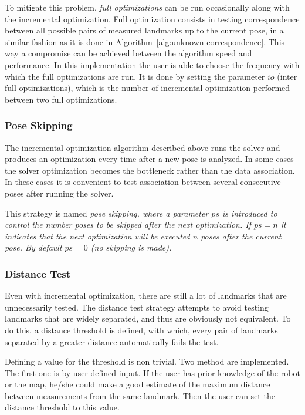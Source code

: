 To mitigate this problem, \emph{full optimizations} can be run occasionally along with the incremental optimization. Full optimization consists in testing correspondence between all possible pairs of measured landmarks up to the current pose, in a similar fashion as it is done in Algorithm~\ref{alg:unknown-correspondence}. This way a compromise can be achieved between the algorithm speed and performance. In this implementation the user is able to choose the frequency with which the full optimizations are run. It is done by setting the parameter $io$ (inter full optimizations), which is the number of incremental optimization performed between two full optimizations. 

\subsubsection{Pose Skipping}

The incremental optimization algorithm described above runs the solver and produces an optimization every time after a new pose is analyzed. In some cases the solver optimization becomes the bottleneck rather than the data association. In these cases it is convenient to  test association between several consecutive poses after running the solver.

This strategy is named \it{pose skipping}, where a parameter $ps$ is introduced to control the number poses to be skipped after the next optimization. If $ps=n$ it indicates that the next optimization will be executed $n$ poses after the current pose. By default $ps=0$ (no skipping is made).    

\subsubsection{Distance Test}

Even with incremental optimization, there are still a lot of landmarks that are unnecessarily tested. The distance test strategy attempts to avoid testing landmarks that are widely separated, and thus are obviously not equivalent. To do this, a distance threshold is defined, with which, every pair of landmarks separated by a greater distance automatically fails the test. 

Defining a value for the threshold is non trivial. Two method are implemented. The first one is by user defined input. If the user has prior knowledge of the robot or the map, he/she could make a good estimate of the maximum distance between measurements from the same landmark. Then the user can set the distance threshold to this value.

